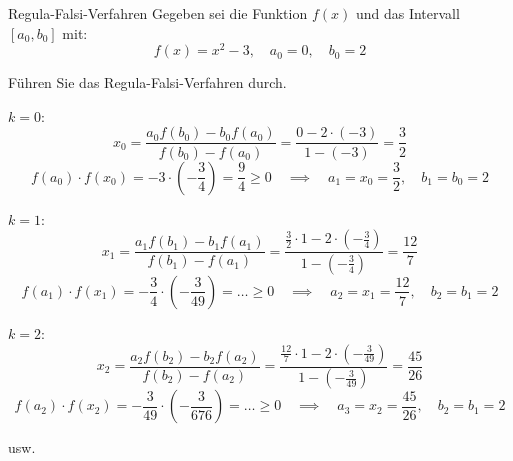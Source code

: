 \begin{example}{Regula-Falsi-Verfahren}
    Gegeben sei die Funktion $f(x)$ und das Intervall $[a_0, b_0]$ mit: 
    \[ 
        f(x) = x^2 - 3, \quad a_0 = 0, \quad b_0 = 2
    \]
    
    Führen Sie das Regula-Falsi-Verfahren durch.
    
    \exampleseparator
    
    $k = 0$:
    \[ 
        x_{0} = \frac{a_0 f(b_0) - b_0 f(a_0)}{f(b_0) - f(a_0)} = \frac{0 - 2 \cdot (-3)}{1 - (-3)} = \frac{3}{2}
    \]
    \[ 
        f(a_0) \cdot f(x_0) = -3 \cdot \left(-\frac{3}{4}\right) = \frac{9}{4} \geq 0 \quad \implies \quad a_1 = x_0 = \frac{3}{2}, \quad b_1 = b_0 = 2
    \]
    
    $k = 1$:
    \[ 
        x_{1} = \frac{a_1 f(b_1) - b_1 f(a_1)}{f(b_1) - f(a_1)} = \frac{\frac{3}{2} \cdot 1 - 2 \cdot \left(-\frac{3}{4}\right)}{1 - \left(-\frac{3}{4}\right)} = \frac{12}{7}
    \]
    \[ 
        f(a_1) \cdot f(x_1) = -\frac{3}{4} \cdot \left(-\frac{3}{49}\right) = \ldots \geq 0 \quad \implies \quad a_2 = x_1 = \frac{12}{7}, \quad b_2 = b_1 = 2
    \]
    
    $k = 2$:
    \[ 
        x_{2} = \frac{a_2 f(b_2) - b_2 f(a_2)}{f(b_2) - f(a_2)} = \frac{\frac{12}{7} \cdot 1 - 2 \cdot \left(-\frac{3}{49}\right)}{1 - \left(-\frac{3}{49}\right)} = \frac{45}{26}
    \]
    \[ 
        f(a_2) \cdot f(x_2) = -\frac{3}{49} \cdot \left(-\frac{3}{676}\right) = \ldots \geq 0 \quad \implies \quad a_3 = x_2 = \frac{45}{26}, \quad b_2 = b_1 = 2
    \]
    
    usw.
    
    \begin{center}
\end{center}
\end{example}
